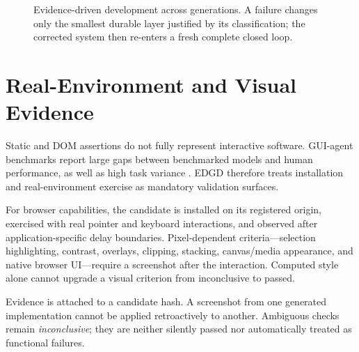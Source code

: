 \documentclass[10pt]{article}
\newcommand{\method}{\textsc{EDGD}\xspace}
\begin{document}
\begin{figure}[H]
\caption{Evidence-driven development across generations. A failure changes only the
smallest durable layer justified by its classification; the corrected system then
re-enters a fresh complete closed loop.}
\label{fig:development-loop}
\end{figure}

\section{Real-Environment and Visual Evidence}

Static and DOM assertions do not fully represent interactive software. GUI-agent benchmarks report large gaps between benchmarked models and human performance, as well as high task variance \citep{xie2024osworld}. \method{} therefore treats installation and real-environment exercise as mandatory validation surfaces.

For browser capabilities, the candidate is installed on its registered origin, exercised with real pointer and keyboard interactions, and observed after application-specific delay boundaries. Pixel-dependent criteria---selection highlighting, contrast, overlays, clipping, stacking, canvas/media appearance, and native browser UI---require a screenshot after the interaction. Computed style alone cannot upgrade a visual criterion from inconclusive to passed.

Evidence is attached to a candidate hash. A screenshot from one generated implementation cannot be applied retroactively to another. Ambiguous checks remain \emph{inconclusive}; they are neither silently passed nor automatically treated as functional failures.
\end{document}
